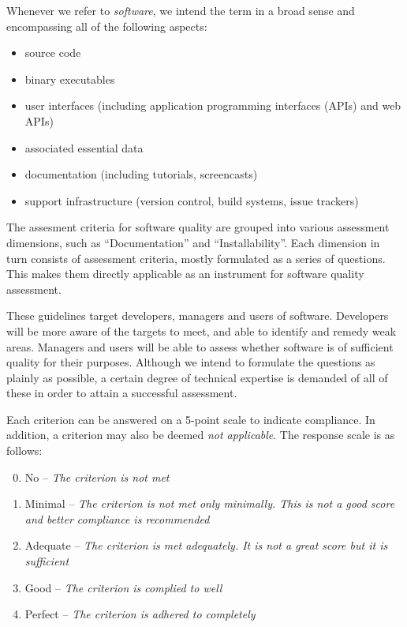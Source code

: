\documentclass[a4paper,11pt]{article}
\begin{document}
Whenever we refer to \emph{software}, we intend the term in a broad sense and
encompassing all of the following aspects:
\begin{itemize}
    \item source code
    \item binary executables
    \item user interfaces (including application programming interfaces (APIs) and web APIs)
    \item associated essential data
%
%
%
    \item documentation (including tutorials, screencasts)
    \item support infrastructure (version control, build systems, issue trackers)
\end{itemize}

The assesment criteria for software quality are grouped into various assessment
dimensions, such as ``Documentation'' and ``Installability''. Each dimension in turn
consists of assessment criteria, mostly formulated as a series of questions. This
makes them directly applicable as an instrument for software quality
assessment. 

These guidelines target developers, managers and users of software.
Developers will be more aware of the targets to meet, and able to identify and
remedy weak areas. Managers and users will be able to assess whether software
is of sufficient quality for their purposes. Although we intend to
formulate the questions as plainly as possible, a certain degree of technical
expertise is demanded of all of these in order to attain a successful
assessment.

Each criterion can be answered on a 5-point scale to indicate compliance. In
addition, a criterion may also be deemed \emph{not applicable}. The response scale is as
follows:

\begin{enumerate}
    \setcounter{enumi}{-1} %
    \item No -- \emph{The criterion is not met}
    \item Minimal -- \emph{The criterion is not met only minimally. This is not a good score and better compliance is recommended}
    \item Adequate -- \emph{The criterion is met adequately. It is not a great score but it is sufficient}
    \item Good -- \emph{The criterion is complied to well}
    \item Perfect -- \emph{The criterion is adhered to completely}
\end{enumerate}
\end{document}
